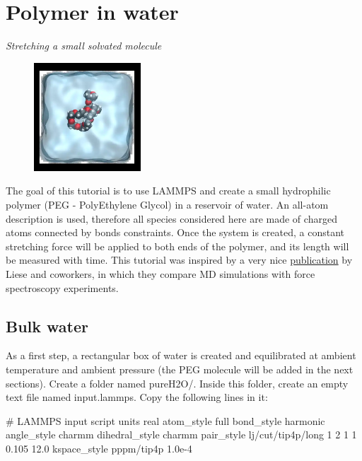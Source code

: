 \chapter{Polymer in water}
\label{all-atoms-label}

\vspace{-1cm} \noindent \textcolor{graytitle}{\textit{{\Large Stretching a small solvated molecule}}\vspace{0.5cm} }

\noindent \hspace{-0.45cm}\begin{figure}
\includegraphics[width=4cm]{tutorials/level2/polymer-in-water/video-PEG-light.png}
\end{figure}

\noindent The goal of this tutorial is to use LAMMPS and
create a small hydrophilic polymer (PEG -
PolyEthylene Glycol) in a reservoir of water. 
An all-atom description is used, therefore all species considered here
are made of charged atoms connected by bonds constraints.
Once the system is created, a constant stretching force will be applied to both
ends of the polymer, and its length will be measured with time.
This tutorial was inspired by a very nice \href{https://doi.org/10.1021/acsnano.6b07071}{publication} by Liese and coworkers, in which
they compare MD simulations with force spectroscopy experiments.

\section{Bulk water}

\noindent As a first step, a rectangular box of water is created and
equilibrated at ambient temperature and ambient pressure (the PEG molecule will be added in the next sections).
Create a folder named pureH2O/. Inside this folder, create
an empty text file named input.lammps. Copy the following
lines in it:

\begin{lcverbatim}
# LAMMPS input script
units real
atom_style full
bond_style harmonic
angle_style charmm
dihedral_style charmm
pair_style lj/cut/tip4p/long 1 2 1 1 0.105 12.0
kspace_style pppm/tip4p 1.0e-4
\end{lcverbatim}

